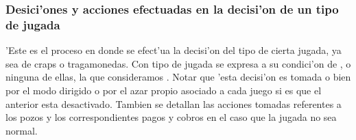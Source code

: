 \subsubsection{Desici'ones y acciones efectuadas en la decisi'on de un tipo de jugada}
'Este es el proceso en donde se efect'ua la decisi'on del tipo de cierta jugada, ya sea de craps o tragamonedas. Con tipo de jugada se expresa a su condici'on de ,  o ninguna de ellas, la que consideramos . Notar que 'esta decisi'on es tomada o bien por el modo dirigido o por el azar propio asociado a cada juego si es que el anterior esta desactivado. Tambien se detallan las acciones tomadas referentes a los pozos y los correspondientes pagos y cobros en el caso que la jugada no sea normal.





